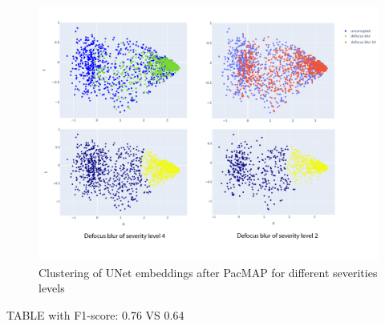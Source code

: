 \begin{figure}[htb]
	\begin{center}
		\includegraphics[width=0.8\linewidth]{bilder/unet-embeddings/db-levels.png}
		\caption{Clustering of UNet embeddings after PacMAP for different severities levels}\label{fig:unet-clustering-sev-levels}
	\end{center}
\end{figure}

TABLE with F1-score:
0.76 VS 0.64
